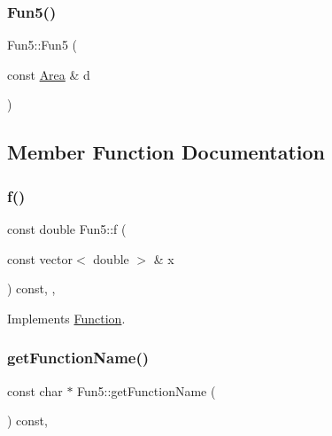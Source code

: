 \mbox{\label{class_fun5_afc0af29fcd319a88b4af446cfacd5533}} 
\subsubsection{\texorpdfstring{Fun5()}{Fun5()}\hspace{0.1cm}{\footnotesize\ttfamily [2/2]}}
{\footnotesize\ttfamily Fun5\+::\+Fun5 (\begin{DoxyParamCaption}\item[{const \hyperlink{class_area}{Area} \&}]{d }\end{DoxyParamCaption})}



\subsection{Member Function Documentation}
\mbox{\label{class_fun5_ae85d60bda47bb388c18723e4e887d409}} 
\subsubsection{\texorpdfstring{f()}{f()}}
{\footnotesize\ttfamily const double Fun5\+::f (\begin{DoxyParamCaption}\item[{const vector$<$ double $>$ \&}]{x }\end{DoxyParamCaption}) const\hspace{0.3cm}{\ttfamily [inline]}, {\ttfamily [override]}, {\ttfamily [virtual]}}



Implements \hyperlink{class_function_a81ec299f137e34109246cde88d88c949}{Function}.

\mbox{\label{class_fun5_acaa887c03e39c037f49205b3b20b7464}} 
\subsubsection{\texorpdfstring{get\+Function\+Name()}{getFunctionName()}}
{\footnotesize\ttfamily const char $\ast$ Fun5\+::get\+Function\+Name (\begin{DoxyParamCaption}{ }\end{DoxyParamCaption}) const\hspace{0.3cm}{\ttfamily [override]}, {\ttfamily [virtual]}}



